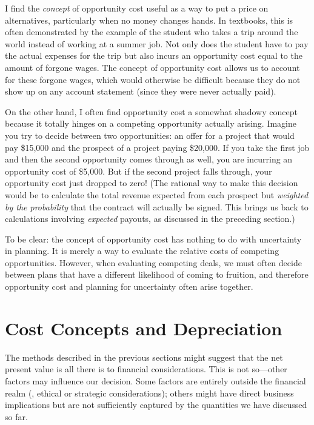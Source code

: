 I find the \emph{concept} of opportunity cost useful as a way to put a
price on alternatives, particularly when no money changes hands. In
textbooks, this is often demonstrated by the example of the student
who takes a trip around the world instead of working at a summer job.
Not only does the student have to pay the actual expenses for the
trip but also incurs an opportunity cost equal to the amount of
forgone wages. The concept of opportunity cost allows us to account
for these forgone wages, which would otherwise be difficult because
they do not show up on any account statement (since they were never
actually paid).

On the other hand, I often find opportunity cost a somewhat shadowy
concept because it totally hinges on a competing opportunity actually
arising. Imagine you try to decide between two opportunities: an offer
for a project that would pay \$15,000 and the prospect of a project
paying \$20,000.  If you take the first job and then the second
opportunity comes through as well, you are incurring an opportunity
cost of \$5,000. But if the second project falls through, your
opportunity cost just dropped to zero! (The rational way to make this
decision would be to calculate the total revenue expected from each
prospect but \emph{weighted by the probability} that the contract will
actually be signed. This brings us back to calculations involving
\emph{expected} payouts, as discussed in the preceding section.)
    
To be clear: the concept of opportunity cost has nothing to do with
uncertainty in planning. It is merely a way to evaluate the relative
costs of competing opportunities. However, when evaluating competing
deals, we must often decide between plans that have a different
likelihood of coming to fruition, and therefore opportunity cost and
planning for uncertainty often arise together.


\section{Cost Concepts and Depreciation}

    
The methods described in the previous sections might suggest that the
net present value is all there is to financial considerations.  This
is not so---other factors may influence our decision. Some factors are
entirely outside the financial realm (\eg, ethical or strategic
considerations); others might have direct business implications but
are not sufficiently captured by the quantities we have discussed so
far.

